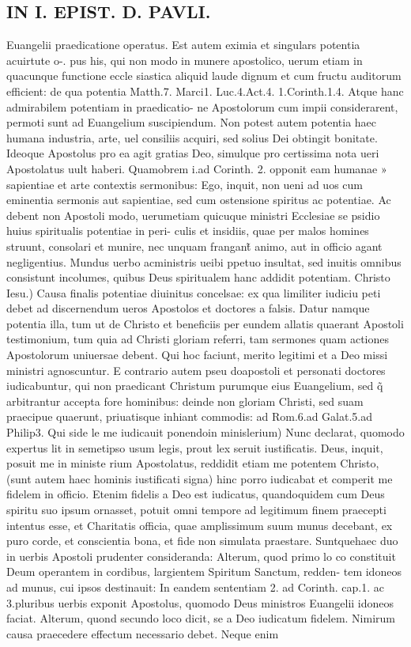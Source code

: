 \documentclass{article}
\begin{document}
\begin{pages}
\section*{IN I. EPIST. D. PAVLI. }
\marginpar{[ p.31 ]}\pstart Euangelii praedicatione operatus. Est autem eximia et singulars potentia acuirtute o-. pus his, qui non modo in munere apostolico, uerum etiam in quacunque  functione eccle siastica aliquid laude dignum et cum fructu auditorum efficient: de qua potentia Matth.7. Marci1. Luc.4.Act.4. 1.Corinth.1.4. Atque  hanc admirabilem potentiam in praedicatio- ne Apostolorum cum impii considerarent, permoti sunt ad Euangelium suscipiendum. Non potest autem potentia haec humana industria, arte, uel consiliis acquiri, sed solius Dei obtingit bonitate. Ideoque  Apostolus pro ea agit gratias Deo, simulque  pro certissima nota ueri Apostolatus uult haberi. Quamobrem i.ad Corinth. 2. opponit eam humanae » sapientiae et arte contextis sermonibus: Ego, inquit, non ueni ad uos cum eminentia   sermonis aut sapientiae, sed cum ostensione spiritus ac potentiae. Ac debent non Apostoli modo, uerumetiam quicuque  ministri Ecclesiae se psidio huius spiritualis potentiae in peri- culis et insidiis, quae per malos homines struunt, consolari et munire, nec unquam frangant̃ animo, aut in officio agant negligentius. Mundus uerbo acministris ueibi ppetuo insultat, sed inuitis omnibus consistunt incolumes, quibus Deus spiritualem hanc addidit potentiam.  \pend\pstart Christo Iesu.) Causa finalis potentiae diuinitus concelsae: ex qua limiliter iudiciu peti debet ad discernendum ueros Apostolos et doctores a falsis. Datur namque  potentia illa, tum ut de Christo et beneficiis per eundem allatis quaerant Apostoli testimonium, tum quia ad Christi gloriam referri, tam sermones quam actiones Apostolorum uniuersae debent. Qui hoc faciunt, merito legitimi et a Deo missi ministri agnoscuntur. E contrario autem pseu doapostoli et personati doctores iudicabuntur, qui non praedicant Christum purumque  eius Euangelium, sed q̃ arbitrantur accepta fore hominibus: deinde non gloriam Christi, sed suam praecipue quaerunt, priuatisque  inhiant commodis: ad Rom.6.ad Galat.5.ad Philip3.  \pend\pstart Qui side le me iudicauit ponendoin minislerium) Nunc declarat, quomodo expertus lit in semetipso usum legis, prout lex seruit iustificatis. Deus, inquit, posuit me in ministe rium Apostolatus, reddidit etiam me potentem Christo, (sunt autem haec hominis iustificati signa) hinc porro iudicabat et comperit me fidelem in officio. Etenim fidelis a Deo est iudicatus, quandoquidem cum Deus spiritu suo ipsum ornasset, potuit omni tempore ad legitimum finem praecepti intentus esse, et Charitatis officia, quae amplissimum suum munus decebant, ex puro corde, et conscientia bona, et fide non simulata praestare. Suntquehaec duo in uerbis Apostoli prudenter consideranda: Alterum, quod primo lo co constituit Deum operantem in cordibus, largientem Spiritum Sanctum, redden- tem idoneos ad munus, cui ipsos destinauit: In eandem sententiam 2. ad Corinth. cap.1. ac 3.pluribus uerbis exponit Apostolus, quomodo Deus ministros Euangelii idoneos faciat. Alterum, quond secundo loco dicit, se a Deo iudicatum fidelem. Nimirum causa praecedere effectum necessario debet. Neque  enim 
\end{pages}
\end{document}
